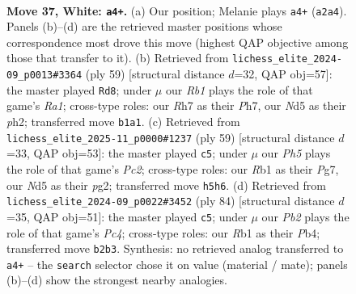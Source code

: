 \documentclass[11pt]{article}
\begin{document}
\clearpage

\begin{figure}[p]\centering
\begin{subfigure}{0.46\textwidth}\centering
\resizebox{\linewidth}{!}{%
\newchessgame
\chessboard[
  setfen={8/pp5R/8/1kpN1p1P/4p3/8/PP4rr/1R1K4 w - - 5 37},
  showmover=false,
  pgfstyle=straightmove, color=movearrow, markmove={a2-a4}
]}
\caption{}
\end{subfigure}\hfill
\begin{subfigure}{0.46\textwidth}\centering
\resizebox{\linewidth}{!}{%
\newchessgame
\chessboard[
  setfen={r5k1/1RR3pp/p7/6r1/8/2p5/P1P3PP/6K1 b - - 2 30},
  showmover=false,
  pgfstyle=straightmove, color=movearrow, markmove={a8-d8}
]}
\caption{}
\end{subfigure}
\\[4pt]
\begin{subfigure}{0.46\textwidth}\centering
\resizebox{\linewidth}{!}{%
\newchessgame
\chessboard[
  setfen={2r5/2pk2pp/p7/8/2R5/1P6/r4PPP/2R2K2 b - - 0 30},
  showmover=false,
  pgfstyle=straightmove, color=movearrow, markmove={c7-c5}
]}
\caption{}
\end{subfigure}\hfill
\begin{subfigure}{0.46\textwidth}\centering
\resizebox{\linewidth}{!}{%
\newchessgame
\chessboard[
  setfen={3r3k/2r4p/p5p1/3P4/1PPR4/8/3p2K1/3N4 w - - 1 43},
  showmover=false,
  pgfstyle=straightmove, color=movearrow, markmove={c4-c5}
]}
\caption{}
\end{subfigure}
\caption{\textbf{Move 37, White: \texttt{a4+}.} (a) Our position; Melanie plays \texttt{a4+} (\texttt{a2a4}). Panels (b)--(d) are the retrieved master positions whose correspondence most drove this move (highest QAP objective among those that transfer to it). (b) Retrieved from \texttt{lichess\_elite\_2024-09\_p0013\#3364} (ply 59) [structural distance $d$=32, QAP obj=57]: the master played \texttt{Rd8}; under $\mu$ our \emph{Rb1} plays the role of that game's \emph{Ra1}; cross-type roles: our \emph{R}h7 as their \emph{P}h7, our \emph{N}d5 as their \emph{p}h2; transferred move \texttt{b1a1}. (c) Retrieved from \texttt{lichess\_elite\_2025-11\_p0000\#1237} (ply 59) [structural distance $d$=33, QAP obj=53]: the master played \texttt{c5}; under $\mu$ our \emph{Ph5} plays the role of that game's \emph{Pc2}; cross-type roles: our \emph{R}b1 as their \emph{P}g7, our \emph{N}d5 as their \emph{p}g2; transferred move \texttt{h5h6}. (d) Retrieved from \texttt{lichess\_elite\_2024-09\_p0022\#3452} (ply 84) [structural distance $d$=35, QAP obj=51]: the master played \texttt{c5}; under $\mu$ our \emph{Pb2} plays the role of that game's \emph{Pc4}; cross-type roles: our \emph{R}b1 as their \emph{P}b4; transferred move \texttt{b2b3}. Synthesis: no retrieved analog transferred to \texttt{a4+} -- the \texttt{search} selector chose it on value (material / mate); panels (b)--(d) show the strongest nearby analogies.}
\label{fig:thought-m72}
\end{figure}
\end{document}
